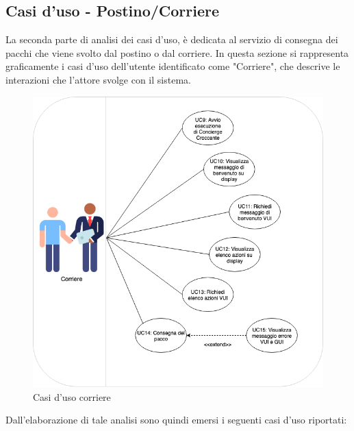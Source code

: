 \subsection{Casi d'uso - Postino/Corriere}
La seconda parte di analisi dei casi d'uso, è dedicata al servizio di consegna dei pacchi che viene svolto dal postino o dal corriere. In questa sezione si rappresenta graficamente i casi d'uso dell'utente identificato come "Corriere", che descrive le interazioni che l'attore svolge con il sistema.
\\
\begin{figure}[H] 
    \centering 
    \includegraphics[width=1\columnwidth]{immagini/casi_duso3.png}
    \caption{\label{fig:casi_duso_corriere}Casi d'uso corriere}
\end{figure}
\newpage
\noindent Dall'elaborazione di tale analisi sono quindi emersi i seguenti casi d'uso riportati:
